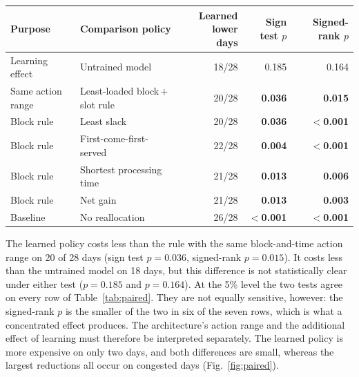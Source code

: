 \begin{center}
\begin{minipage}{\textwidth}
\centering
{}
\label{tab:paired}
\small
\setlength{\tabcolsep}{4pt}
\begin{tabular}{@{}>{\raggedright\arraybackslash}p{}>{\raggedright\arraybackslash}p{}rrr@{}}
\toprule
Purpose & Comparison policy & \shortstack{Learned lower\\days} &
\shortstack{Sign test\\$p$} & \shortstack{Signed-rank\\$p$} \\
\midrule
Learning effect & Untrained model & 18/28 & 0.185 & 0.164 \\
Same action range & Least-loaded block\,+\,slot rule & 20/28 & \textbf{0.036} & \textbf{0.015} \\
Block rule & Least slack & 20/28 & \textbf{0.036} & \textbf{$<$0.001} \\
Block rule & First-come-first-served & 22/28 & \textbf{0.004} & \textbf{$<$0.001} \\
Block rule & Shortest processing time & 21/28 & \textbf{0.013} & \textbf{0.006} \\
Block rule & Net gain & 21/28 & \textbf{0.013} & \textbf{0.003} \\
Baseline & No reallocation & 26/28 & \textbf{$<$0.001} & \textbf{$<$0.001} \\
\bottomrule
\end{tabular}
\end{minipage}
\end{center}
The learned policy costs less than the rule with the same block-and-time
action range on 20 of 28 days (sign test $p=0.036$, signed-rank
$p=0.015$). It costs less than the untrained model on 18 days, but this
difference is not statistically clear under either test ($p=0.185$ and
$p=0.164$). At the 5\% level the two tests agree on every row of
Table~\ref{tab:paired}. They are not equally sensitive, however: the
signed-rank $p$ is the smaller of the two in six of the seven rows, which
is what a concentrated effect produces. The architecture's
action range and the additional effect of learning must therefore be
interpreted separately. The learned policy is more expensive on only
two days, and both differences are small, whereas the largest reductions
all occur on congested days (Fig.~\ref{fig:paired}).

